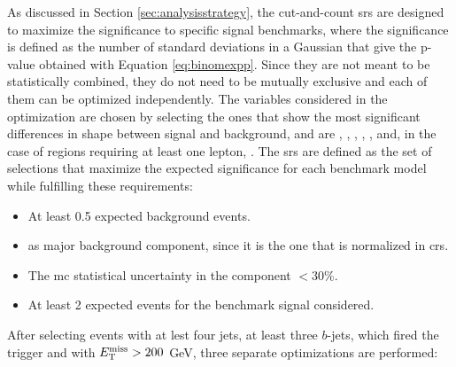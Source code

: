 As discussed in Section \ref{sec:analysisstrategy}, the cut-and-count \glspl{sr} are designed to maximize the significance to specific 
signal benchmarks, where the significance is defined as the number of standard deviations in a Gaussian that give the p-value obtained with Equation \ref{eq:binomexpp}.
Since they are not meant to be statistically combined, they do not need to be mutually exclusive and each of them can be optimized independently.
The variables considered in the optimization are chosen by selecting the ones that show the most significant differences in shape between signal and background, and are \njet, \nbjet, \met, \meff, \mjsum, \mtb and, in the case of regions requiring at least one lepton, \mt.
The \glspl{sr} are defined as the set of selections that maximize the expected significance for each benchmark model while fulfilling these requirements:
\begin{itemize}
\item At least 0.5 expected background events.
\item \ttbar as major background component, since it is the one that is normalized in \glspl{cr}.
\item The \gls{mc} statistical uncertainty in the \ttbar component $<30$\%.
\item At least 2 expected events for the benchmark signal considered. 
\end{itemize}
After selecting events with at lest four jets, at least three $b$-jets, which fired the \met trigger and with $E_{\rm T}^{\mathrm{miss}}>200$ GeV, three separate optimizations are performed:

